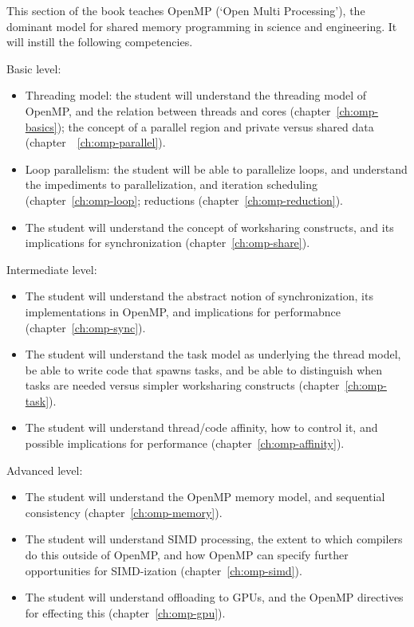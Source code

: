 
This section of the book teaches OpenMP (`Open Multi Processing'),
the dominant model for shared memory programming in science and engineering.
It will instill the following competencies.

Basic level:
\begin{itemize}
\item Threading model: the student will understand the threading model of OpenMP,
  and the relation between threads and cores (chapter~\ref{ch:omp-basics});
  the concept of a parallel region and private versus shared data
  (chapter~~\ref{ch:omp-parallel}).
\item Loop parallelism: the student will be able to parallelize loops,
  and understand the impediments to parallelization, and
  iteration scheduling (chapter~\ref{ch:omp-loop};
  reductions (chapter~\ref{ch:omp-reduction}).
\item The student will understand the concept of worksharing constructs,
  and its implications for synchronization (chapter~\ref{ch:omp-share}).
\end{itemize}

Intermediate level:
\begin{itemize}
\item The student will understand the abstract notion of synchronization,
  its implementations in OpenMP, and implications for performabnce
  (chapter~\ref{ch:omp-sync}).
\item The student will understand the task model as underlying the thread model,
  be able to write code that spawns tasks, and be able to distinguish
  when tasks are needed versus simpler worksharing constructs
  (chapter~\ref{ch:omp-task}).
\item The student will understand thread/code affinity, how to control it,
  and possible implications for performance (chapter~\ref{ch:omp-affinity}).
\end{itemize}

Advanced level:
\begin{itemize}
\item The student will understand the OpenMP memory model,
  and sequential consistency (chapter~\ref{ch:omp-memory}).
\item The student will understand \acs{SIMD} processing, the extent to which
  compilers do this outside of OpenMP,
  and how OpenMP can specify further opportunities for SIMD-ization
  (chapter~\ref{ch:omp-simd}).
\item The student will understand offloading to \acp{GPU},
  and the OpenMP directives for effecting this (chapter~\ref{ch:omp-gpu}).
\end{itemize}

